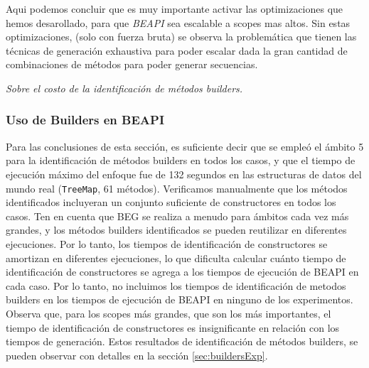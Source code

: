 Aqui podemos concluir que es muy importante activar las optimizaciones que hemos desarollado, para que \emph{BEAPI} sea escalable a scopes mas altos.
Sin estas optimizaciones, (solo con fuerza bruta) se observa la problemática que tienen las técnicas de generación exhaustiva para poder escalar dada la gran cantidad de combinaciones de métodos para poder generar secuencias.

\emph{Sobre el costo de la identificación de métodos builders.} 



\subsubsection{Uso de Builders en BEAPI}
Para las conclusiones de esta sección, es suficiente decir que se empleó el ámbito 5 para la identificación de métodos builders en todos los casos, y que el tiempo de ejecución máximo del enfoque fue de 132 segundos en las estructuras de datos del mundo real (\texttt{TreeMap}, 61 métodos). Verificamos manualmente que los métodos identificados incluyeran un conjunto suficiente de constructores en todos los casos. Ten en cuenta que BEG se realiza a menudo para ámbitos cada vez más grandes, y los métodos builders identificados se pueden reutilizar en diferentes ejecuciones. Por lo tanto, los tiempos de identificación de constructores se amortizan en diferentes ejecuciones, lo que dificulta calcular cuánto tiempo de identificación de constructores se agrega a los tiempos de ejecución de \textsf{BEAPI} en cada caso. Por lo tanto, no incluimos los tiempos de identificación de metodos builders en los tiempos de ejecución de \textsf{BEAPI} en ninguno de los experimentos. Observa que, para los scopes más grandes, que son los más importantes, el tiempo de identificación de constructores es insignificante en relación con los tiempos de generación.
Estos resultados de identificación de métodos builders, se pueden observar con detalles en la sección \ref{sec:buildersExp}.



